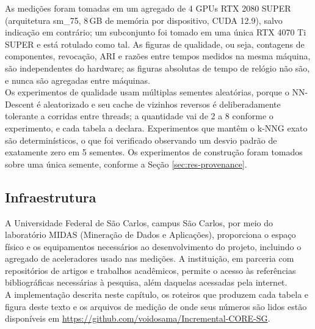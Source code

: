 As medições foram tomadas em um agregado de 4 \ac{GPU}s RTX 2080 SUPER (arquitetura sm\_75, 8\,GB de memória por dispositivo, \ac{CUDA} 12.9), salvo indicação em contrário; um subconjunto foi tomado em uma única RTX 4070 Ti SUPER e está rotulado como tal. As figuras de qualidade, ou seja, contagens de componentes, revocação, \ac{ARI} e razões entre tempos medidos na mesma máquina, são independentes do hardware; as figuras absolutas de tempo de relógio não são, e nunca são agregadas entre máquinas.\\

Os experimentos de qualidade usam múltiplas sementes aleatórias, porque o NN-Descent é aleatorizado e seu cache de vizinhos reversos é deliberadamente tolerante a corridas entre threads; a quantidade vai de 2 a 8 conforme o experimento, e cada tabela a declara. Experimentos que mantêm o \ac{k-NNG} exato são determinísticos, o que foi verificado observando um desvio padrão de exatamente zero em 5 sementes. Os experimentos de construção foram tomados sobre uma única semente, conforme a Seção \ref{sec:res-provenance}.\\

\subsection{Infraestrutura\label{sec:infrastructure}}

A Universidade Federal de São Carlos, campus São Carlos, por meio do laboratório MIDAS (Mineração de Dados e Aplicações), proporciona o espaço físico e os equipamentos necessários ao desenvolvimento do projeto, incluindo o agregado de aceleradores usado nas medições. A instituição, em parceria com repositórios de artigos e trabalhos acadêmicos, permite o acesso às referências bibliográficas necessárias à pesquisa, além daquelas acessadas pela internet.\\

A implementação descrita neste capítulo, os roteiros que produzem cada tabela e figura deste texto e os arquivos de medição de onde seus números são lidos estão disponíveis em \url{https://github.com/voidosama/Incremental-CORE-SG}.\\
